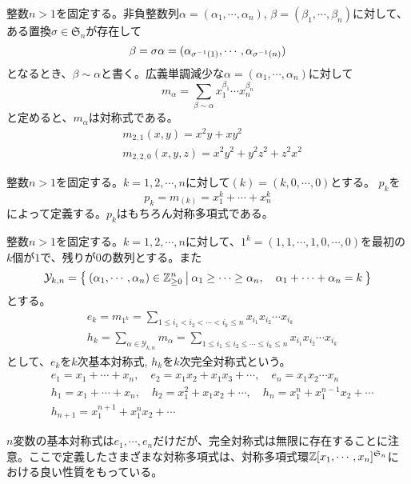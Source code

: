 \documentclass{ltjsreport}
\begin{document}
\begin{eg}[単項対称式]
    整数$n>1$を固定する。非負整数列$\alpha=(\alpha_1,\cdots,\alpha_n)$, $\beta=(\beta_1,\cdots,\beta_n)$に対して、ある置換$\sigma\in\mathfrak{S}_n$が存在して
    \[
    \beta=\sigma\alpha=(\alpha_{\sigma^{-1}(1)},\cdots,\alpha_{\sigma^{-1}(n)})    
    \]
    となるとき、$\beta\sim\alpha$と書く。広義単調減少な$\alpha=(\alpha_1,\cdots,\alpha_n)$に対して
    \[
    m_\alpha=\sum_{\beta\sim\alpha}x_1^{\beta_1}\cdots x_n^{\beta_n}    
    \]
    と定めると、$m_\alpha$は対称式である。
    \begin{align*}
        &m_{2,1}(x,y)=x^2y+xy^2\\
        &m_{2,2,0}(x,y,z)=x^2y^2+y^2z^2+z^2x^2
    \end{align*}
\end{eg}

\begin{eg}[べき和対称式]
    整数$n>1$を固定する。$k=1,2,\cdots,n$に対して$(k)=(k,0,\cdots,0)$とする。
    $p_k$を
    \[
    p_k
    =m_{(k)}
    =x_1^k+\cdots+x_n^k
    \]
    によって定義する。$p_k$はもちろん対称多項式である。
\end{eg}

\begin{eg}
    整数$n>1$を固定する。$k=1,2,\cdots,n$に対して、$1^k=(1,1,\cdots,1,0,\cdots,0)$を最初の$k$個が$1$で、残りが$0$の数列とする。また
    \[
    \mathcal{Y}_{k,n}=\left\{\:(\alpha_1,\cdots,\alpha_n)\in\mathbb{Z}_{\geq 0}^n\:\middle|\:\alpha_1\geq \cdots\geq\alpha_n,\quad\alpha_1+\cdots+\alpha_n=k\:\right\}    
    \]
    とする。
    \begin{align*}
        &e_k=m_{1^k}=\sum_{1\leq i_1<i_2<\cdots<i_k\leq n}x_{i_1}x_{i_2}\cdots x_{i_k}\\
        &h_k=\sum_{\alpha\in\mathcal{Y}_{k,n}}m_\alpha=\sum_{1\leq i_1\leq i_2\leq\cdots\leq i_k\leq n}x_{i_1}x_{i_2}\cdots x_{i_k}
    \end{align*}
    として、$e_k$を$k$次基本対称式, $h_k$を$k$次完全対称式という。
    \begin{align*}
        &e_1=x_1+\cdots+x_n,\quad e_2=x_1x_2+x_1x_3+\cdots,\quad e_n=x_1x_2\cdots x_n\\
        &h_1=x_1+\cdots+x_n,\quad h_2=x_1^2+x_1x_2+\cdots, \quad h_n=x_1^n+x_1^{n-1}x_2+\cdots\\
        &h_{n+1}=x_1^{n+1}+x_1^nx_2+\cdots
    \end{align*}
\end{eg}


$n$変数の基本対称式は$e_1,\cdots, e_n$だけだが、完全対称式は無限に存在することに注意。ここで定義したさまざまな対称多項式は、対称多項式環$\mathbb{Z}[x_1,\cdots,x_n]^{\mathfrak{S}_n}$における良い性質をもっている。
\end{document}
